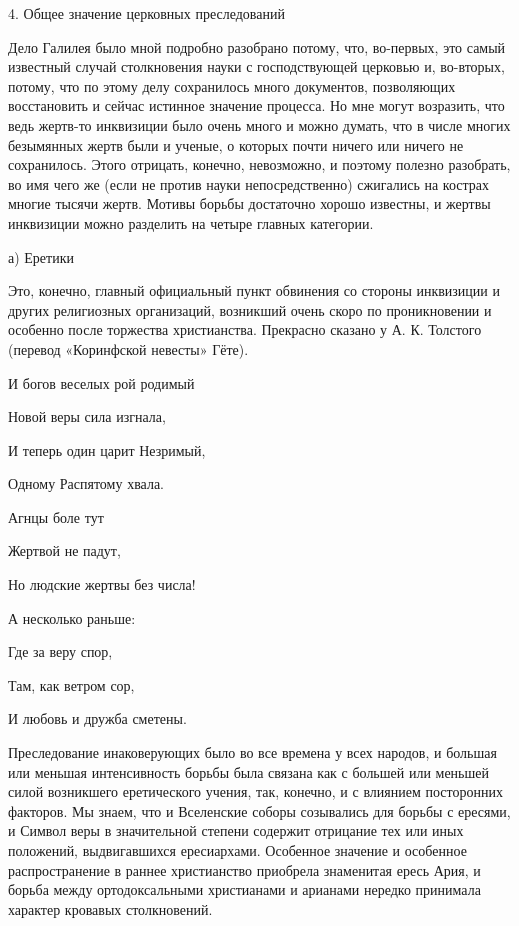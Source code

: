 4. Общее значение церковных преследований

Дело Галилея было мной подробно  разобрано потому, что, во-первых, это
самый известный случай столкновения науки с господствующей церковью и,
во-вторых,  потому, что  по этому  делу сохранилось  много документов,
позволяющих восстановить  и сейчас истинное значение  процесса. Но мне
могут возразить, что ведь жертв-то инквизиции было очень много и можно
думать, что в  числе многих безымянных жертв были и  ученые, о которых
почти  ничего  или ничего  не  сохранилось.  Этого отрицать,  конечно,
невозможно,  и поэтому  полезно разобрать,  во  имя чего  же (если  не
против  науки  непосредственно)  сжигались на  кострах  многие  тысячи
жертв. Мотивы  борьбы достаточно хорошо известны,  и жертвы инквизиции
можно разделить на четыре главных категории.

а) Еретики

Это,  конечно,   главный  официальный   пункт  обвинения   со  стороны
инквизиции и других религиозных  организаций, возникший очень скоро по
проникновении  и  особенно  после  торжества  христианства.  Прекрасно
сказано у А. К. Толстого (перевод «Коринфской невесты» Гёте).

И богов веселых рой родимый

Новой веры сила изгнала,

И теперь один царит Незримый,

Одному Распятому хвала.

Агнцы боле тут

Жертвой не падут,

Но людские жертвы без числа!

А несколько раньше:

Где за веру спор,

Там, как ветром сор,

И любовь и дружба сметены.

Преследование  инаковерующих было  во все  времена у  всех народов,  и
большая или  меньшая интенсивность борьбы  была связана как  с большей
или меньшей  силой возникшего еретического  учения, так, конечно,  и с
влиянием  посторонних  факторов. Мы  знаем,  что  и Вселенские  соборы
созывались для борьбы с ересями,  и Символ веры в значительной степени
содержит отрицание тех или  иных положений, выдвигавшихся ересиархами.
Особенное значение  и особенное распространение в  раннее христианство
приобрела  знаменитая  ересь  Ария,  и  борьба  между  ортодоксальными
христианами   и   арианами   нередко   принимала   характер   кровавых
столкновений.

